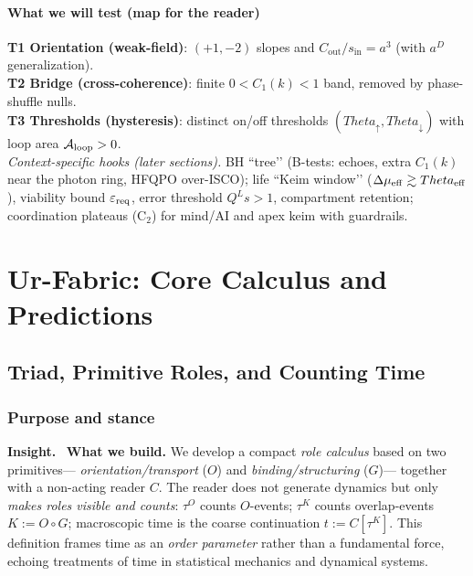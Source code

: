 \documentclass[12pt,a4paper,oneside]{scrreprt}
\def\Theta{Theta}%
\newenvironment{insight}{\par\vspace{0.5em}\noindent\textbf{Insight.}\ }{\par\vspace{0.5em}}
\begin{document}
\subsection*{What we will test (map for the reader)}
\textbf{T1 Orientation (weak-field)}: $(+1,-2)$ slopes and $C_{\mathrm{out}}/s_{\mathrm{in}}=a^3$ (with $a^{D}$ generalization).\\
\textbf{T2 Bridge (cross-coherence)}: finite $0<C_1(k)<1$ band, removed by phase-shuffle nulls.\\
\textbf{T3 Thresholds (hysteresis)}: distinct on/off thresholds $(\Theta_\uparrow,\Theta_\downarrow)$ with loop area $\mathcal A_{\rm loop}>0$.\\[0.3em]
\emph{Context-specific hooks (later sections).} 
BH “tree’’ (B-tests: echoes, extra $C_1(k)$ near the photon ring, HFQPO over-ISCO); 
life “Keim window’’ ($\Delta\mu_{\rm eff}\gtrsim \Theta_{\rm eff}$), viability bound $\varepsilon_{\rm req}$, error threshold $Q^L s>1$, compartment retention; 
coordination plateaus (C$_2$) for mind/AI and apex keim with guardrails.

\part{Ur-Fabric: Core Calculus and Predictions}\label{part:ur}

\chapter{Triad, Primitive Roles, and Counting Time}\label{ch:ur-triad}

\section{Purpose and stance}\label{sec:ur-purpose}

\begin{insight}
\textbf{What we build.} 
We develop a compact \emph{role calculus} based on two primitives—
\emph{orientation/transport} ($O$) and \emph{binding/structuring} ($G$)—
together with a non-acting reader $C$. 
The reader does not generate dynamics but only \emph{makes roles visible and counts}: 
$\tau^O$ counts $O$-events; $\tau^K$ counts overlap-events $K := O \!\circ G$; 
macroscopic time is the coarse continuation $t := C[\tau^K]$. 
This definition frames time as an \emph{order parameter} rather than a fundamental force, 
echoing treatments of time in statistical mechanics and dynamical systems.
\end{insight}
\end{document}
